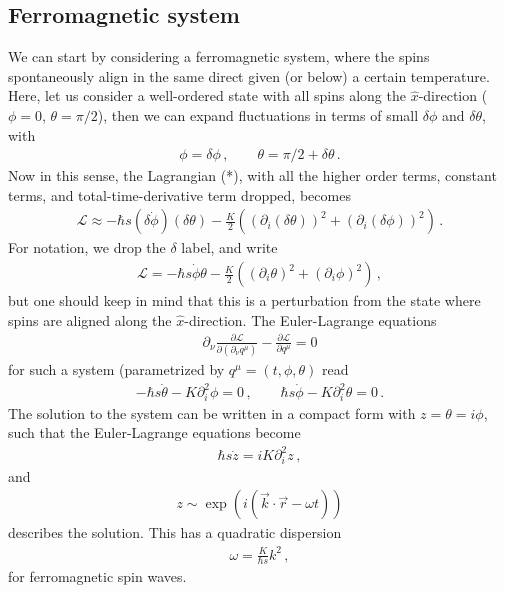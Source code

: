 \documentclass[11pt, onesided]{book}
\theoremstyle{break}
\theoremstyle{break}
\newcommand{\pd}{\partial}
\begin{document}
\subsection{Ferromagnetic system}
We can start by considering a ferromagnetic system, where the spins spontaneously align in the same direct given (or below) a certain temperature. Here, let us consider a well-ordered state with all spins along the $\hat{x}$-direction ($\phi = 0$, $\theta = \pi/2$), then we can expand fluctuations in terms of small $\delta \phi$ and $\delta \theta$, with
\begin{align*}
\phi = \delta \phi\,,\qquad
\theta = \pi/2 + \delta \theta\,.
\end{align*}
Now in this sense, the Lagrangian (*), with all the higher order terms, constant terms, and total-time-derivative term dropped, becomes
\begin{align*}
\mathcal{L} \approx -\hbar s (\delta\dot{\phi})(\delta \theta) - \frac{K}{2}\left( (\pd_i (\delta\theta))^2 + (\pd_i(\delta \phi))^2\right)\,.
\end{align*}
For notation, we drop the $\delta$ label, and write
\begin{align*}
\mathcal{L} = -\hbar s \dot{\phi}\theta - \frac{K}{2}\left((\pd_i \theta)^2 + (\pd_i\phi)^2\right)\,,
\end{align*}
but one should keep in mind that this is a perturbation from the state where spins are aligned along the $\hat{x}$-direction. The Euler-Lagrange equations
\begin{align*}
\pd_\nu\frac{\pd\mathcal{L}}{\pd(\pd_\nu q^\mu)}- \frac{\pd\mathcal{L}}{\pd q^\mu} = 0
\end{align*} for such a system (parametrized by $q^\mu = (t,\phi,\theta)$ read
\begin{align*}
-\hbar s \dot{\theta} - K \pd_i^2 \phi = 0\,,\qquad
 \hbar s\dot{\phi} -K \pd_i^2 \theta = 0\,.
\end{align*}
The solution to the system can be written in a compact form with $z = \theta = i\phi$, such that the Euler-Lagrange equations become 
\begin{align*}
\hbar s\dot{z} = iK \pd_i^2 z \,,
\end{align*}
and 
\begin{align*}
z \sim \exp\left( i (\vec{k}\cdot \vec{r}- \omega t)\right)
\end{align*}
describes the solution. This has a quadratic dispersion
\begin{align*}
\omega = \frac{K}{\hbar s}k^2\,,
\end{align*}
for ferromagnetic spin waves.
\end{document}
